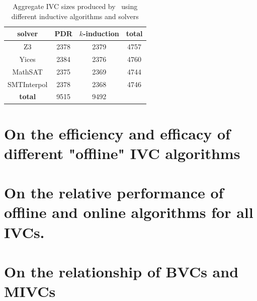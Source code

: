 
\begin{table}
  \caption{Aggregate IVC sizes produced by \ucalg\ using different inductive algorithms and solvers}
  \centering
  \begin{tabular}{ |c|c|c|c| }
    \hline
     solver & PDR & $k$-induction & \textbf{total} \\
    \hline
      Z3 & 2378 & 2379 & 4757 \\
      Yices & 2384 & 2376 & 4760 \\
      MathSAT & 2375 & 2369 & 4744 \\
      SMTInterpol & 2378 & 2368 & 4746 \\
    \hline
      \textbf{total} & 9515 & 9492 &   \\
    \hline
  \end{tabular}
  \label{tab:minimality-algorithm-solvers}
\end{table}



\section{On the efficiency and efficacy of different "offline" IVC algorithms}
\label{sec:exp1}


\section{On the relative performance of offline and online algorithms for all IVCs.}
\label{sec:exp2}



\section{On the relationship of BVCs and MIVCs}
\label{sec:exp3}


